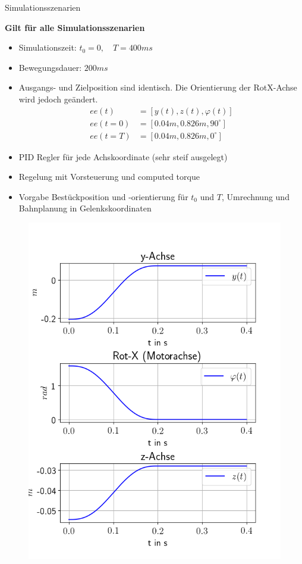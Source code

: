 \documentclass[10pt,xcolor=dvipsnames]{beamer}
\begin{document}
	\begin{frame}{Simulationsszenarien}
		\begin{minipage}{0.58\textwidth}
			\textbf{Gilt für alle Simulationsszenarien}
			\begin{itemize}
				\item Simulationszeit: $ t_{0} = 0, \quad T = 400ms $
				\item Bewegungsdauer: $ 200ms $
				\item Ausgangs- und Zielposition sind identisch. Die Orientierung der RotX-Achse wird jedoch geändert.
					\begin{align*}
					ee(t) &= [y(t), z(t), \varphi(t)]\\
					ee(t=0) &= [0.04m,0.826m,90^{\circ}]\\
					ee(t=T) &= [0.04m,0.826m,0^{\circ}]
					\end{align*}	
				\item PID Regler für jede Achskoordinate (sehr steif ausgelegt)
				\item Regelung mit Vorsteuerung und computed torque
				\item Vorgabe Bestückposition und -orientierung für $ t_{0} $ und $ T $, Umrechnung und Bahnplanung in Gelenkskoordinaten
			\end{itemize}
		\end{minipage}	
		\hfill
		\begin{minipage}{0.39\textwidth}
			\vspace{-0.2cm}
			\begin{figure}
				\includegraphics[width=1.1\linewidth]{./pics/input_starr.png}

\end{figure}
\end{minipage}
\end{frame}
\end{document}
